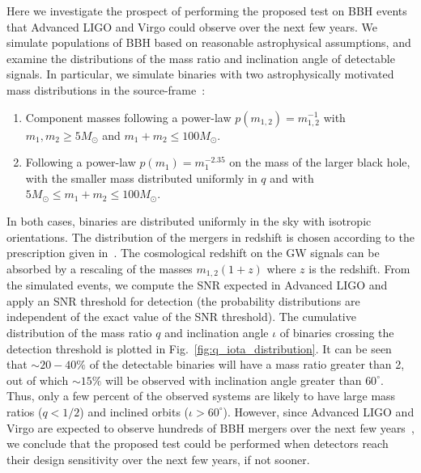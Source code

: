 \documentclass[prl,preprintnumbers,twocolumn,eqsecnum,floatfix,a4paper,nofootinbib,superscriptaddress]{revtex4}
\begin{document}
Here we investigate the  prospect of performing the proposed test on BBH events that Advanced LIGO and Virgo could observe over the next few years.  We simulate populations of BBH based on reasonable astrophysical assumptions, and examine the distributions of the mass ratio and inclination angle of detectable signals. In particular, we simulate binaries with two astrophysically motivated mass distributions in the source-frame~\cite{Abbott:2016nhf}:
\begin{enumerate}
\item Component masses following a power-law $p(m_{1,2}) = m_{1,2}^{-1}$   with $m_1, m_2 \geq 5 M_\odot$ and $m_1 + m_2  \leq 100 M_\odot$. 
\item Following a power-law $p(m_1) = m_1^{-2.35}$ on the mass of the larger black hole, with the smaller mass distributed uniformly in $q$ and with $5 M_\odot \leq m_1 + m_2  \leq 100 M_\odot$. 
\end{enumerate}
In both cases, binaries are distributed uniformly in the sky with isotropic orientations. The distribution of the mergers in redshift is chosen according to the prescription given in~\cite{Dominik:2013tma}. The cosmological redshift on the GW signals can be absorbed by a rescaling of the masses $m_{1,2} (1+z)$ where $z$ is the redshift. From the simulated events, we compute the SNR expected  in Advanced LIGO and apply an SNR threshold for detection (the probability distributions are independent of the exact value of the SNR threshold). The cumulative distribution of the mass ratio $q$ and inclination angle $\iota$ of binaries crossing the detection threshold is plotted in Fig.~\ref{fig:q_iota_distribution}. It can be seen that $\sim 20 - 40\%$ of the detectable binaries will have a mass ratio greater than 2, out of which  $\sim 15\%$ will  be observed with inclination angle greater than $60^\circ$. Thus, only a few percent of the observed systems are likely to have large mass ratios ($q < 1/2$) and inclined orbits ($\iota > 60^\circ$). However, since Advanced LIGO and Virgo are expected to observe hundreds of BBH mergers over the next few years~\cite{Abbott:2016nhf}, we conclude that the proposed test could be performed when detectors reach their design sensitivity over the next few years, if not sooner.
\end{document}
